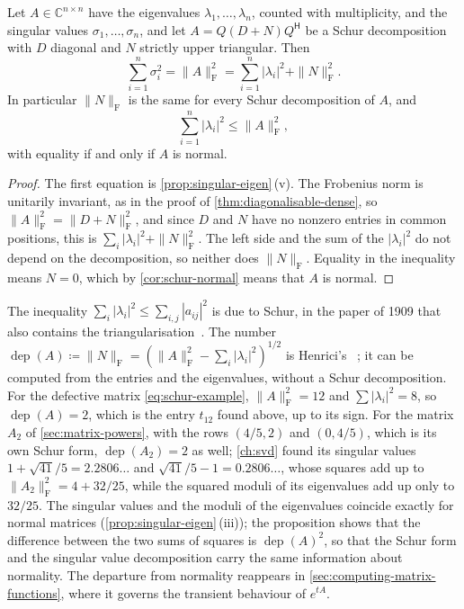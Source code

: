 \begin{proposition}
\label{prop:schur-inequality}
Let $A\in\mathbb C^{n\times n}$ have the eigenvalues $\lambda_1,\ldots,\lambda_n$, counted with multiplicity, and the singular values $\sigma_1,\ldots,\sigma_n$, and let $A=Q(D+N)Q^{\mathsf H}$ be a Schur decomposition with $D$ diagonal and $N$ strictly upper triangular. Then
\[
\sum_{i=1}^n\sigma_i^2=\|A\|_{\mathrm F}^2=\sum_{i=1}^n|\lambda_i|^2+\|N\|_{\mathrm F}^2 .
\]
In particular $\|N\|_{\mathrm F}$ is the same for every Schur decomposition of $A$, and
\[
\sum_{i=1}^n|\lambda_i|^2\le\|A\|_{\mathrm F}^2,
\]
with equality if and only if $A$ is normal.
\end{proposition}

\begin{proof}
The first equation is \cref{prop:singular-eigen}\,(v). The Frobenius norm is unitarily invariant, as in the proof of \cref{thm:diagonalisable-dense}, so $\|A\|_{\mathrm F}^2=\|D+N\|_{\mathrm F}^2$, and since $D$ and $N$ have no nonzero entries in common positions, this is $\sum_i|\lambda_i|^2+\|N\|_{\mathrm F}^2$. The left side and the sum of the $|\lambda_i|^2$ do not depend on the decomposition, so neither does $\|N\|_{\mathrm F}$. Equality in the inequality means $N=0$, which by \cref{cor:schur-normal} means that $A$ is normal.
\end{proof}

The inequality $\sum_i|\lambda_i|^2\le\sum_{i,j}|a_{ij}|^2$ is due to Schur, in the paper of 1909 that also contains the triangularisation~\cite{schur1909}. The number $\operatorname{dep}(A)\coloneqq\|N\|_{\mathrm F}=(\|A\|_{\mathrm F}^2-\sum_i|\lambda_i|^2)^{1/2}$ is Henrici's ~\cite{henrici1962}; it can be computed from the entries and the eigenvalues, without a Schur decomposition. For the defective matrix \eqref{eq:schur-example}, $\|A\|_{\mathrm F}^2=12$ and $\sum|\lambda_i|^2=8$, so $\operatorname{dep}(A)=2$, which is the entry $t_{12}$ found above, up to its sign. For the matrix $A_2$ of \cref{sec:matrix-powers}, with the rows $(4/5,2)$ and $(0,4/5)$, which is its own Schur form, $\operatorname{dep}(A_2)=2$ as well; \cref{ch:svd} found its singular values $1+\sqrt{41}/5=2.2806\ldots$ and $\sqrt{41}/5-1=0.2806\ldots$, whose squares add up to $\|A_2\|_{\mathrm F}^2=4+32/25$, while the squared moduli of its eigenvalues add up only to $32/25$. The singular values and the moduli of the eigenvalues coincide exactly for normal matrices (\cref{prop:singular-eigen}\,(iii)); the proposition shows that the difference between the two sums of squares is $\operatorname{dep}(A)^2$, so that the Schur form and the singular value decomposition carry the same information about normality. The departure from normality reappears in \cref{sec:computing-matrix-functions}, where it governs the transient behaviour of $e^{tA}$.

